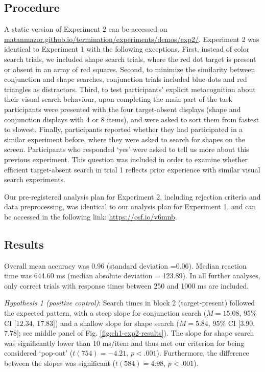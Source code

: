\documentclass[12pt,twoside]{reedthesis}
\begin{document}
\hypertarget{procedure-1}{%
\subsection{Procedure}\label{procedure-1}}

A static version of Experiment 2 can be accessed on \href{matanmazor.github.io/termination/experiments/demos/exp1/}{matanmazor.github.io/termination/experiments/demos/exp2/}. Experiment 2 was identical to Experiment 1 with the following exceptions. First, instead of color search trials, we included shape search trials, where the red dot target is present or absent in an array of red squares. Second, to minimize the similarity between conjunction and shape searches, conjunction trials included blue dots and red triangles as distractors. Third, to test participants' explicit metacognition about their visual search behaviour, upon completing the main part of the task participants were presented with the four target-absent displays (shape and conjunction displays with 4 or 8 items), and were asked to sort them from fastest to slowest. Finally, participants reported whether they had participated in a similar experiment before, where they were asked to search for shapes on the screen. Participants who responded `yes' were asked to tell us more about this previous experiment. This question was included in order to examine whether efficient target-absent search in trial 1 reflects prior experience with similar visual search experiments.

Our pre-registered analysis plan for Experiment 2, including rejection criteria and data preprocessing, was identical to our analysis plan for Experiment 1, and can be accessed in the following link: \url{https://osf.io/v6mnb}.

\hypertarget{results-1}{%
\subsection{Results}\label{results-1}}

Overall mean accuracy was 0.96 (standard deviation =0.06). Median reaction time was 644.60 ms (median absolute deviation = 123.89). In all further analyses, only correct trials with response times between 250 and 1000 ms are included.

\emph{Hypothesis 1 (positive control)}: Search times in block 2 (target-present) followed the expected pattern, with a steep slope for conjunction search (\(M = 15.08\), 95\% CI \([12.34\), \(17.83]\)) and a shallow slope for shape search (\(M = 5.84\), 95\% CI \([3.90\), \(7.78]\); see middle panel of Fig. \ref{fig:ch1-exp2-results}). The slope for shape search was significantly lower than 10 ms/item and thus met our criterion for being considered `pop-out' (\(t(754) = -4.21\), \(p < .001\)). Furthermore, the difference between the slopes was significant (\(t(584) = 4.98\), \(p < .001\)).
\end{document}
